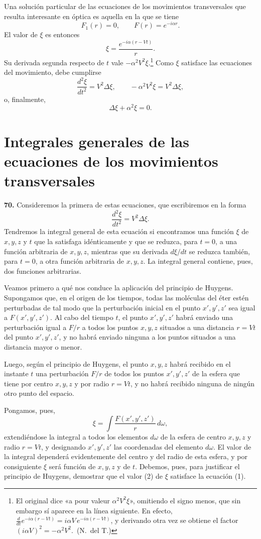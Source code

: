Una solución particular de las ecuaciones de los movimientos transversales
que resulta interesante en óptica es aquella en la que se tiene
\[
F_1(r)=0,\qquad F(r)=e^{-i\alpha r}.
\]
El valor de $\xi$ es entonces
\[
\xi = \frac{e^{-i\alpha(r-Vt)}}{r}.
\]
Su derivada segunda respecto de $t$ vale $-\alpha^2V^2\xi$.\footnote{El
original dice «a pour valeur $\alpha^2V^2\xi$», omitiendo el signo
menos, que sin embargo sí aparece en la línea siguiente. En efecto,
$\frac{d}{dt}e^{-i\alpha(r-Vt)}=i\alpha V\,e^{-i\alpha(r-Vt)}$, y derivando
otra vez se obtiene el factor $(i\alpha V)^2=-\alpha^2V^2$.~(N.~del T.)} Como $\xi$
satisface las ecuaciones del movimiento, debe cumplirse
\[
\frac{d^2\xi}{dt^2}=V^2\Delta\xi,\qquad
-\alpha^2V^2\xi = V^2\Delta\xi,
\]
o, finalmente,
\[
\Delta\xi + \alpha^2\xi = 0.
\]

\section{Integrales generales de las ecuaciones de los movimientos
transversales}

\noindent\textbf{70.} Consideremos la primera de estas ecuaciones, que
escribiremos en la forma
\[
\frac{d^2\xi}{dt^2}=V^2\Delta\xi. \tag{1}
\]
Tendremos la integral general de esta ecuación si encontramos una función
$\xi$ de $x,y,z$ y $t$ que la satisfaga idénticamente y que se reduzca,
para $t=0$, a una función arbitraria de $x,y,z$, mientras que su derivada
$d\xi/dt$ se reduzca también, para $t=0$, a otra función arbitraria de
$x,y,z$. La integral general contiene, pues, dos funciones arbitrarias.

Veamos primero a qué nos conduce la aplicación del principio de Huygens.
Supongamos que, en el origen de los tiempos, todas las moléculas del éter
estén perturbadas de tal modo que la perturbación inicial en el punto
$x',y',z'$ sea igual a $F(x',y',z')$. Al cabo del tiempo $t$, el punto
$x',y',z'$ habrá enviado una perturbación igual a $F/r$ a todos los puntos
$x,y,z$ situados a una distancia $r=Vt$ del punto $x',y',z'$, y no habrá
enviado ninguna a los puntos situados a una distancia mayor o menor.

Luego, según el principio de Huygens, el punto $x,y,z$ habrá recibido en el
instante $t$ una perturbación $F/r$ de todos los puntos $x',y',z'$ de la
esfera que tiene por centro $x,y,z$ y por radio $r=Vt$, y no habrá recibido
ninguna de ningún otro punto del espacio.

Pongamos, pues,
\[
\xi = \int \frac{F(x',y',z')}{r}\,d\omega, \tag{2}
\]
extendiéndose la integral a todos los elementos $d\omega$ de la esfera de
centro $x,y,z$ y radio $r=Vt$, y designando $x',y',z'$ las coordenadas del
elemento $d\omega$. El valor de la integral dependerá evidentemente del
centro y del radio de esta esfera, y por consiguiente $\xi$ será función de
$x,y,z$ y de $t$. Debemos, pues, para justificar el principio de Huygens,
demostrar que el valor (2) de $\xi$ satisface la ecuación (1).

